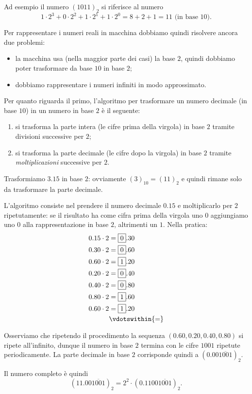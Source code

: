 Ad esempio il numero $(1011)_2$ si riferisce al numero \[
    1 \cdot 2^3 + 0 \cdot 2^2 + 1 \cdot 2^1 + 1 \cdot 2^0 = 8 + 2 + 1 = 11 \text{ (in base $10$).}
\]

Per rappresentare i numeri reali in macchina dobbiamo quindi risolvere ancora due problemi:
\begin{itemize}
    \item la macchina usa (nella maggior parte dei casi) la base $2$, quindi dobbiamo poter trasformare da base $10$ in base $2$;
    \item dobbiamo rappresentare i numeri infiniti in modo approssimato.
\end{itemize}

Per quanto riguarda il primo, l'algoritmo per trasformare un numero decimale (in base $10$) in un numero in base $2$ è il seguente:
\begin{enumerate}
    \item si trasforma la parte intera (le cifre prima della virgola) in base $2$ tramite divisioni successive per $2$;
    \item si trasforma la parte decimale (le cifre dopo la virgola) in base $2$ tramite \emph{moltiplicazioni} successive per $2$.
\end{enumerate}

\begin{example}
    Trasformiamo $3.15$ in base $2$: ovviamente $(3)_{10} = (11)_2$ e quindi rimane solo da trasformare la parte decimale. 
    
    L'algoritmo consiste nel prendere il numero decimale $0.15$ e moltiplicarlo per $2$ ripetutamente: se il risultato ha come cifra prima della virgola uno $0$ aggiungiamo uno $0$ alla rappresentazione in base $2$, altrimenti un $1$. Nella pratica:
    \begin{align*}
        0.15 \cdot 2 &= \boxed{0}.30 \\
        0.30 \cdot 2 &= \boxed{0}.60 \\
        0.60 \cdot 2 &= \boxed{1}.20 \\
        0.20 \cdot 2 &= \boxed{0}.40 \\
        0.40 \cdot 2 &= \boxed{0}.80 \\
        0.80 \cdot 2 &= \boxed{1}.60 \\
        0.60 \cdot 2 &= \boxed{1}.20 \\
        &\vdotswithin{=} 
    \end{align*} 

    Osserviamo che ripetendo il procedimento la sequenza $(0.60, 0.20, 0.40, 0.80)$ si ripete all'infinito, dunque il numero in base $2$ termina con le cifre $1001$ ripetute periodicamente. La parte decimale in base $2$ corrisponde quindi a $(0.00\overline{1001})_2$.

    Il numero completo è quindi \[
        (11.00\overline{1001})_2 = 2^2 \cdot (0.1100\overline{1001})_2.
    \]
\end{example}

